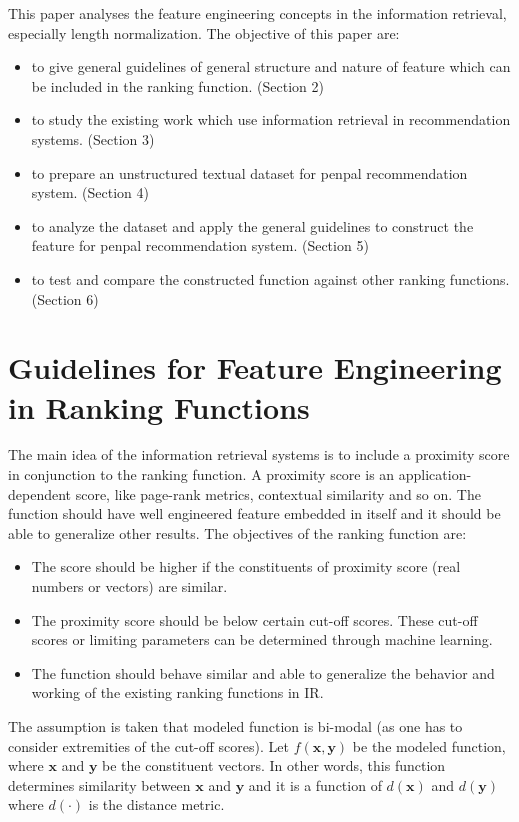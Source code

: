 \documentclass[11pt]{article}
\begin{document}
	This paper analyses the feature engineering concepts in the information retrieval, especially length normalization. The objective of this paper are:
	
	\begin{itemize}
		\item to give general guidelines of general structure and nature of feature which can be included in the ranking function. (Section 2)
		\item to study the existing work which use information retrieval in recommendation systems. (Section 3)
		\item to prepare an unstructured textual dataset for penpal recommendation system. (Section 4)
		\item to analyze the dataset and apply the general guidelines to construct the feature for penpal recommendation system. (Section 5)
		\item to test and compare the constructed function against other ranking functions. (Section 6)
	\end{itemize}
	
	\section{Guidelines for Feature Engineering in Ranking Functions}
	
	The main idea of the information retrieval systems is to include a proximity score in conjunction to the ranking function. A proximity score is an application-dependent score, like page-rank metrics, contextual similarity and so on. The function should have well engineered feature embedded in itself and it should be able to generalize other results. The objectives of the ranking function are:
	
	\begin{itemize}
		\item The score should be higher if the constituents of proximity score (real numbers or vectors) are similar.
		\item The proximity score should be below certain cut-off scores. These cut-off scores or limiting parameters can be determined through machine learning.
		\item The function should behave similar and able to generalize the behavior and working of the existing ranking functions in IR.
	\end{itemize}
	
	The assumption is taken that modeled function is bi-modal (as one has to consider extremities of the cut-off scores). Let $f(\mathbf{x}, \mathbf{y})$ be the modeled function, where $\mathbf{x}$ and $\mathbf{y}$ be the constituent vectors. In other words, this function determines similarity between $\mathbf{x}$ and $\mathbf{y}$ and it is a function of $d(\mathbf{x})$ and $d(\mathbf{y})$ where $d(\cdot)$ is the distance metric.
	
\end{document}
